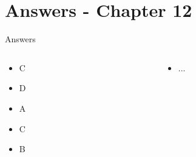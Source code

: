 \documentclass{beamer}
\begin{document}
\section{Answers - Chapter 12}

\begin{frame}{Answers}
\small
\begin{columns}[T]
\begin{column}{0.5\textwidth}
\begin{itemize}
\item C
\item D
\item A
\item C
\item B
\end{itemize}
\end{column}
\begin{column}{0.5\textwidth}
\begin{itemize}
\item ...
\end{itemize}
\end{column}
\end{columns}
\end{frame}
\end{document}
